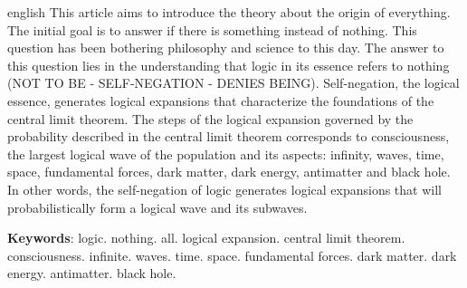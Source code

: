 \vspace{1mm}
\renewcommand{\resumoname}{Abstract}
\begin{resumoumacoluna}
 \begin{otherlanguage*}{english}
\vspace{-2mm}
	This article aims to introduce the theory about the origin of everything. The initial goal is to answer if there is something instead of nothing. This question has been bothering philosophy and science to this day. The answer to this question lies in the understanding that logic in its essence refers to nothing (NOT TO BE - SELF-NEGATION - DENIES BEING). Self-negation, the logical essence, generates logical expansions that characterize the foundations of the central limit theorem. The steps of the logical expansion governed by the probability described in the central limit theorem corresponds to consciousness, the largest logical wave of the population and its aspects: infinity, waves, time, space, fundamental forces, dark matter, dark energy, antimatter and black hole. In other words, the self-negation of logic generates logical expansions that will probabilistically form a logical wave and its subwaves.
\noindent
	
	\textbf{Keywords}: logic. nothing. all. logical expansion. central limit theorem. consciousness. infinite. waves. time. space. fundamental forces. dark matter. dark energy. antimatter. black hole.
 \end{otherlanguage*}  
\end{resumoumacoluna}
